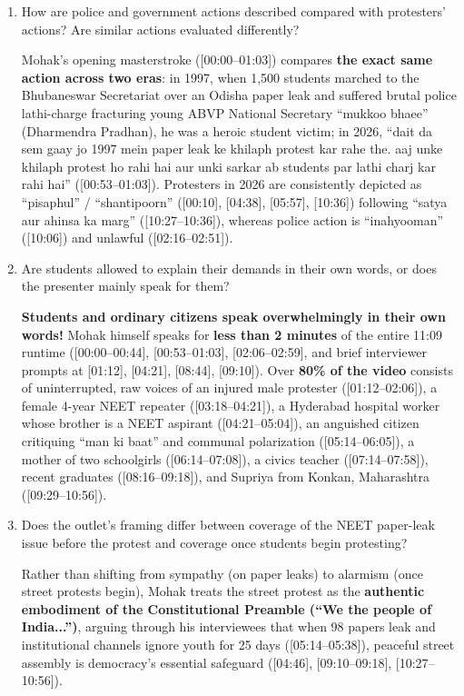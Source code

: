 \documentclass[10pt,a4paper]{article}
\begin{document}
{\begin{enumerate}[leftmargin=1.5em, itemsep=6pt, topsep=4pt]
  \item How are police and government actions described compared with protesters' actions? Are similar actions evaluated differently?\par\smallskip
  Mohak's opening masterstroke ([00:00--01:03]) compares \textbf{the exact same action across two eras}: in 1997, when 1,500 students marched to the Bhubaneswar Secretariat over an Odisha paper leak and suffered brutal police lathi-charge fracturing young ABVP National Secretary ``mukkoo bhaee'' (Dharmendra Pradhan), he was a heroic student victim; in 2026, ``dait da sem gaay jo 1997 mein paper leak ke khilaph protest kar rahe the. aaj unke khilaph protest ho rahi hai aur unki sarkar ab students par lathi charj kar rahi hai'' ([00:53--01:03]). Protesters in 2026 are consistently depicted as ``pisaphul'' / ``shantipoorn'' ([00:10], [04:38], [05:57], [10:36]) following ``satya aur ahinsa ka marg'' ([10:27--10:36]), whereas police action is ``inahyooman'' ([10:06]) and unlawful ([02:16--02:51]).
  \item Are students allowed to explain their demands in their own words, or does the presenter mainly speak for them?\par\smallskip
  \textbf{Students and ordinary citizens speak overwhelmingly in their own words!} Mohak himself speaks for \textbf{less than 2 minutes} of the entire 11:09 runtime ([00:00--00:44], [00:53--01:03], [02:06--02:59], and brief interviewer prompts at [01:12], [04:21], [08:44], [09:10]). Over \textbf{80\% of the video} consists of uninterrupted, raw voices of an injured male protester ([01:12--02:06]), a female 4-year NEET repeater ([03:18--04:21]), a Hyderabad hospital worker whose brother is a NEET aspirant ([04:21--05:04]), an anguished citizen critiquing ``man ki baat'' and communal polarization ([05:14--06:05]), a mother of two schoolgirls ([06:14--07:08]), a civics teacher ([07:14--07:58]), recent graduates ([08:16--09:18]), and Supriya from Konkan, Maharashtra ([09:29--10:56]).
  \item Does the outlet's framing differ between coverage of the NEET paper-leak issue before the protest and coverage once students begin protesting?\par\smallskip
  Rather than shifting from sympathy (on paper leaks) to alarmism (once street protests begin), Mohak treats the street protest as the \textbf{authentic embodiment of the Constitutional Preamble (``We the people of India...'')}, arguing through his interviewees that when 98 papers leak and institutional channels ignore youth for 25 days ([05:14--05:38]), peaceful street assembly is democracy's essential safeguard ([04:46], [09:10--09:18], [10:27--10:56]).
\end{enumerate}
}
\end{document}
